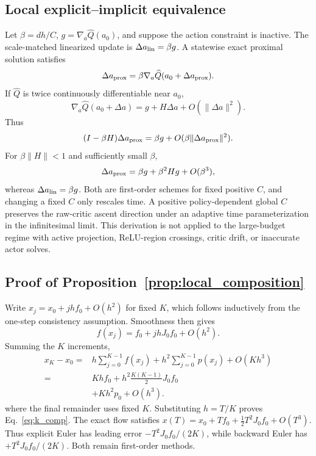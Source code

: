 \subsection{Local explicit--implicit equivalence}
Let $\beta=dh/C$, $g=\nabla_a\widehat Q(a_0)$, and suppose the action
constraint is inactive. The scale-matched linearized update is
$\Delta a_{\rm lin}=\beta g$. A statewise exact proximal solution satisfies
\begin{equation}
\Delta a_{\rm prox}
=\beta\nabla_a\widehat Q(a_0+\Delta a_{\rm prox}).
\end{equation}
If $\widehat Q$ is twice continuously differentiable near $a_0$,
\begin{equation}
\nabla_a\widehat Q(a_0+\Delta a)
=g+H\Delta a+O(\|\Delta a\|^2).
\end{equation}
Thus
\begin{equation}
(I-\beta H)\Delta a_{\rm prox}
=\beta g+O(\beta\|\Delta a_{\rm prox}\|^2).
\end{equation}
For $\beta\|H\|<1$ and sufficiently small $\beta$,
\begin{equation}
\Delta a_{\rm prox}=\beta g+\beta^2Hg+O(\beta^3),
\end{equation}
whereas $\Delta a_{\rm lin}=\beta g$. Both are first-order schemes for fixed
positive $C$, and changing a fixed $C$ only rescales time. A positive
policy-dependent global $C$ preserves the raw-critic ascent direction under an
adaptive time parameterization in the infinitesimal limit. This derivation is
not applied to the large-budget regime with active projection, ReLU-region
crossings, critic drift, or inaccurate actor solves.

\subsection{Proof of Proposition~\ref{prop:local_composition}}
Write $x_j=x_0+jhf_0+O(h^2)$ for fixed $K$, which follows inductively from the
one-step consistency assumption. Smoothness then gives
\begin{equation}
f(x_j)=f_0+jhJ_0f_0+O(h^2).
\end{equation}
Summing the $K$ increments,
\begin{equation}
\begin{aligned}
x_K-x_0
={}&h\sum_{j=0}^{K-1}f(x_j)
+h^2\sum_{j=0}^{K-1}p(x_j)+O(Kh^3)\\
={}&Khf_0+h^2\frac{K(K-1)}{2}J_0f_0\\
&+Kh^2p_0+O(h^3).
\end{aligned}
\end{equation}
where the final remainder uses fixed $K$. Substituting $h=T/K$ proves
Eq.~\eqref{eq:k_comp}. The exact flow satisfies
$x(T)=x_0+Tf_0+\tfrac12T^2J_0f_0+O(T^3)$. Thus explicit Euler has leading
error $-T^2J_0f_0/(2K)$, while backward Euler has
$+T^2J_0f_0/(2K)$. Both remain first-order methods.

